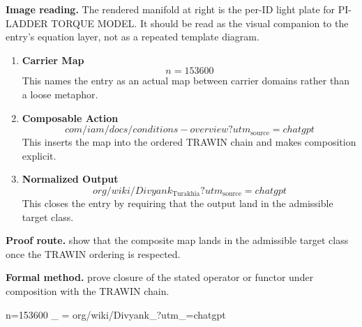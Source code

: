 \begin{samepage}
\noindent\begin{minipage}[t]{0.45\linewidth}
\vspace{0pt}
\raggedright
\scriptsize\textbf{Image reading.} The rendered manifold at right is the per-ID light plate for PI-LADDER TORQUE MODEL. It should be read as the visual companion to the entry's equation layer, not as a repeated template diagram.\par
\end{minipage}\hfill
\begin{minipage}[t]{0.53\linewidth}
\vspace*{-0.10in}
\raggedright
{}
\end{minipage}
\end{samepage}

\clearpage


\begin{enumerate}[leftmargin=1.6em,itemsep=9pt,topsep=6pt]
\item \textbf{Carrier Map}
\[
n=153600
\]
This names the entry as an actual map between carrier domains rather than a loose metaphor.

\item \textbf{Composable Action}
\[
com/iam/docs/conditions-overview?utm_{\mathrm{source}}=chatgpt
\]
This inserts the map into the ordered TRAWIN chain and makes composition explicit.

\item \textbf{Normalized Output}
\[
org/wiki/Divyank_{\mathrm{Turakhia}}?utm_{\mathrm{source}}=chatgpt
\]
This closes the entry by requiring that the output land in the admissible target class.
\end{enumerate}

\textbf{Proof route.} show that the composite map lands in the admissible target class once the TRAWIN ordering is respected.

\textbf{Formal method.} prove closure of the stated operator or functor under composition with the TRAWIN chain.

\medskip
{}

\begin{tzpsnapshot}
\end{tzpsnapshot}

\tzpequationlinks
  {n=153600}
  {_{} = \cdots}
  {org/wiki/Divyank_{}?utm_{}=chatgpt}
